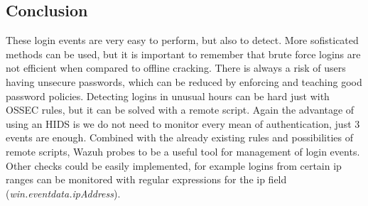 \subsection{Conclusion}
These login events are very easy to perform, but also to detect.
More sofisticated methods can be used, but it is important to remember that brute force logins are not efficient when compared to offline cracking.
There is always a risk of users having unsecure passwords, which can be reduced by enforcing and teaching good password policies.
\linej
Detecting logins in unusual hours can be hard just with OSSEC rules, but it can be solved with a remote script.
\linej
\linej
Again the advantage of using an HIDS is we do not need to monitor every mean of authentication, just 3 events are enough. Combined with the already existing rules and possibilities of remote scripts, Wazuh probes to be a useful tool for management of login events. Other checks could be easily implemented, for example logins from certain ip ranges can be monitored with regular expressions for the ip field (\textit{win.eventdata.ipAddress}).
